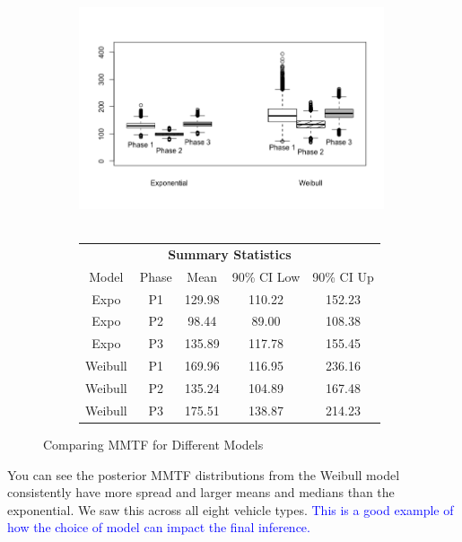 \documentclass[12pt]{article}
\begin{document}
\begin{figure}[ht]
\centering
\begin{subfigure}{.5\textwidth}
  \centering
      \includegraphics[width=9cm, height=7cm]{Boxplots}
\end{subfigure}%
\begin{subfigure}{.5\textwidth}
  \center
  \begin{tabular}{|c|c|c|c|c|}
  \multicolumn{5}{c}{\textbf{Summary Statistics}} \\
  \cline{1-5}
  Model & Phase & Mean & 90\% CI Low & 90\% CI Up \\
  \hline
  Expo & P1   & 129.98   & 110.22 &  152.23 \\
  Expo & P2   & 98.44  & 89.00 &  108.38  \\
  Expo & P3   & 135.89   & 117.78 &  155.45 \\
  Weibull & P1   & 169.96  & 116.95 & 236.16 \\
  Weibull & P2   & 135.24   & 104.89 & 167.48 \\
  Weibull & P3   & 175.51   & 138.87 & 214.23 \\
  \hline
  \end{tabular}
\end{subfigure}
\caption{Comparing MMTF for Different Models}
\label{fig:MMTF Results}
\end{figure}

You can see the posterior MMTF distributions from the Weibull model consistently have more
spread and larger means and medians than the exponential.  We saw this across all eight vehicle types.  \textcolor{blue}{This is a good example of how the choice of model can impact the final inference.}
\end{document}
